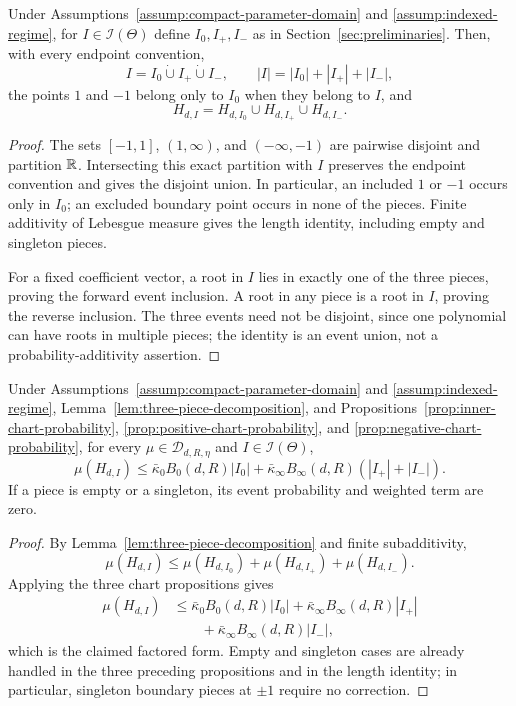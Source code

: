 \begin{lemma}
\label{lem:three-piece-decomposition}
Under Assumptions~\ref{assump:compact-parameter-domain} and
\ref{assump:indexed-regime}, for $I\in\mathcal I(\Theta)$ define
$I_0,I_+,I_-$ as in Section~\ref{sec:preliminaries}.  Then, with every
endpoint convention,
\[
I=I_0\mathbin{\dot\cup}I_+\mathbin{\dot\cup}I_-,
\qquad
|I|=|I_0|+|I_+|+|I_-|,
\]
the points $1$ and $-1$ belong only to $I_0$ when they belong to $I$, and
\[
H_{d,I}=H_{d,I_0}\cup H_{d,I_+}\cup H_{d,I_-}.
\]
\end{lemma}

\begin{proof}
The sets $[-1,1]$, $(1,\infty)$, and $(-\infty,-1)$ are pairwise disjoint
and partition $\mathbb{R}$.  Intersecting this exact partition with $I$ preserves
the endpoint convention and gives the disjoint union.  In particular, an
included $1$ or $-1$ occurs only in $I_0$; an excluded boundary point occurs
in none of the pieces.  Finite additivity of Lebesgue measure gives the
length identity, including empty and singleton pieces.

For a fixed coefficient vector, a root in $I$ lies in exactly one of the
three pieces, proving the forward event inclusion.  A root in any piece is a
root in $I$, proving the reverse inclusion.  The three events need not be
disjoint, since one polynomial can have roots in multiple pieces; the identity
is an event union, not a probability-additivity assertion.
\end{proof}

\begin{proposition}
\label{prop:weighted-chart-bound}
Under Assumptions~\ref{assump:compact-parameter-domain} and
\ref{assump:indexed-regime}, Lemma~\ref{lem:three-piece-decomposition}, and
Propositions~\ref{prop:inner-chart-probability},
\ref{prop:positive-chart-probability}, and
\ref{prop:negative-chart-probability}, for every
$\mu\in\mathcal D_{d,R,\eta}$ and $I\in\mathcal I(\Theta)$,
\[
\mu(H_{d,I})
\leq\bar\kappa_0B_0(d,R)|I_0|
 +\bar\kappa_\infty B_\infty(d,R)(|I_+|+|I_-|).
\]
If a piece is empty or a singleton, its event probability and weighted term
are zero.
\end{proposition}

\begin{proof}
By Lemma~\ref{lem:three-piece-decomposition} and finite subadditivity,
\[
\mu(H_{d,I})
\leq\mu(H_{d,I_0})+\mu(H_{d,I_+})+\mu(H_{d,I_-}).
\]
Applying the three chart propositions gives
\[
\begin{aligned}
\mu(H_{d,I})
&\leq\bar\kappa_0B_0(d,R)|I_0|
 +\bar\kappa_\infty B_\infty(d,R)|I_+|\\
&\qquad+\bar\kappa_\infty B_\infty(d,R)|I_-|,
\end{aligned}
\]
which is the claimed factored form.  Empty and singleton cases are already
handled in the three preceding propositions and in the length identity; in
particular, singleton boundary pieces at $\pm1$ require no correction.
\end{proof}

